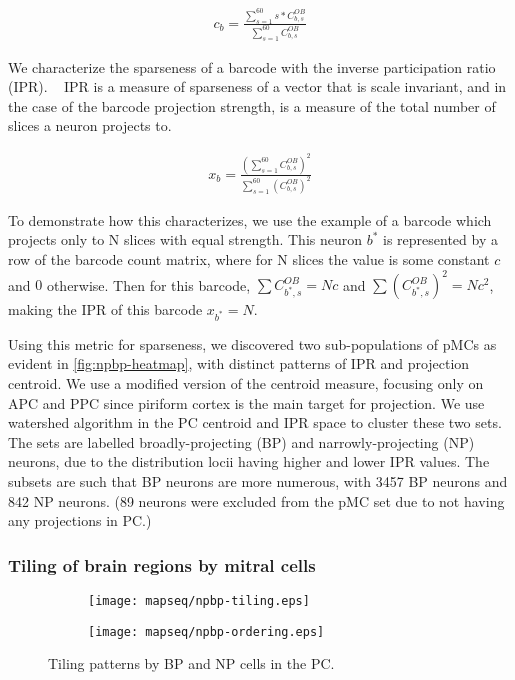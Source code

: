 \documentclass[../dissertation.tex]{subfiles}
\begin{document}
\begin{align}
    c_b = \frac{\sum_{s=1}^60 s * C^{OB}_{b,s}}{\sum_{s=1}^60 C^{OB}_{b,s}}
\end{align}

We characterize the sparseness of a barcode with the inverse participation ratio (IPR).
~\cite{mapseq106}
IPR is a measure of sparseness of a vector that is scale invariant, and in the case of the barcode projection strength, is a measure of the total number of slices a neuron projects to.

\begin{align}
    x_b = \frac{\left(\sum_{s=1}^60 C^{OB}_{b,s}\right)^2}{\sum_{s=1}^60 \left( C^{OB}_{b,s} \right) ^ 2}
\end{align}

To demonstrate how this characterizes, we use the example of a barcode which projects only to N slices with equal strength.
This neuron $b^*$ is represented by a row of the barcode count matrix, where for N slices the value is some constant $c$ and $0$ otherwise.
Then for this barcode, $\sum C^{OB}_{b^*,s} = Nc$ and $\sum \left( C^{OB}_{b^*,s} \right)^2 = Nc^2$, making the IPR of this barcode $x_{b^*} = N$.

Using this metric for sparseness, we discovered two sub-populations of pMCs as evident in \cref{fig:npbp-heatmap}, with distinct patterns of IPR and projection centroid.
We use a modified version of the centroid measure, focusing only on APC and PPC since piriform cortex is the main target for projection.
We use watershed algorithm in the PC centroid and IPR space to cluster these two sets.
The sets are labelled broadly-projecting (BP) and narrowly-projecting (NP) neurons, due to the distribution locii having higher and lower IPR values.
The subsets are such that BP neurons are more numerous, with 3457 BP neurons and 842 NP neurons.
(89 neurons were excluded from the pMC set due to not having any projections in PC.)

\subsubsection{Tiling of brain regions by mitral cells}

\begin{figure}[ht!]
    \centering
    \begin{subfigure}[b]{0.3\textwidth}
        \texttt{[image: mapseq/npbp-tiling.eps]}
        \label{fig:npbpTiling-exp}
    \end{subfigure}
    \hfill
    \begin{subfigure}[b]{0.6\textwidth}
        \texttt{[image: mapseq/npbp-ordering.eps]}
        \label{fig:npbpTiling-ord}
    \end{subfigure}

    \caption{Tiling patterns by BP and NP cells in the PC.}
    \label{fig:npbpTiling}
\end{figure}
\end{document}
